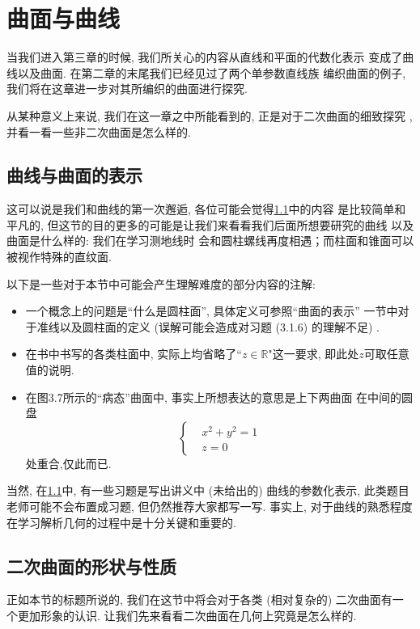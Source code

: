 \documentclass[./main.tex]{subfiles}
\begin{document}
\chapter{曲面与曲线}
    当我们进入第三章的时候, 我们所关心的内容从直线和平面的代数化表示
    变成了曲线以及曲面. 在第二章的末尾我们已经见过了两个单参数直线族
    编织曲面的例子, 我们将在这章进一步对其所编织的曲面进行探究. \par
    从某种意义上来说, 我们在这一章之中所能看到的, 正是对于二次曲面的细致探究
    , 并看一看一些非二次曲面是怎么样的. 
\section{曲线与曲面的表示}\label{3.1}

这可以说是我们和曲线的第一次邂逅, 各位可能会觉得\ref{3.1}中的内容
是比较简单和平凡的, 但这节的目的更多的可能是让我们来看看我们后面所想要研究的曲线
以及曲面是什么样的: 我们在学习测地线时
会和圆柱螺线再度相遇；而柱面和锥面可以被视作特殊的直纹面.

以下是一些对于本节中可能会产生理解难度的部分内容的注解: 
\begin{itemize}
    \item 一个概念上的问题是``什么是圆柱面'', 具体定义可参照``曲面的表示''
    一节中对于准线以及圆柱面的定义 (误解可能会造成对习题 (3.1.6) 的理解不足) . 
    \item 在书中书写的各类柱面中, 实际上均省略了``$z\in\mathbb{R}$"这一要求, 
    即此处$z$可取任意值的说明. 
    \item 在图3.7所示的``病态''曲面中, 事实上所想表达的意思是上下两曲面
        在中间的圆盘
        \[
            \left\{\begin{aligned}
            &x^2+y^2=1\\
            &z=0
            \end{aligned}\right.
        \]
        处重合,仅此而已. 
\end{itemize}

当然, 在\ref{3.1}中, 有一些习题是写出讲义中 (未给出的) 曲线的参数化表示, 此类题目老师可能不会布置成习题, 但仍然推荐大家都写一写. 事实上, 对于曲线的熟悉程度
在学习解析几何的过程中是十分关键和重要的. 
\section{二次曲面的形状与性质}\label{3.2}
正如本节的标题所说的, 我们在这节中将会对于各类 (相对复杂的) 二次曲面有一个更加形象的认识. 让我们先来看看二次曲面在几何上究竟是怎么样的. 
\end{document}
